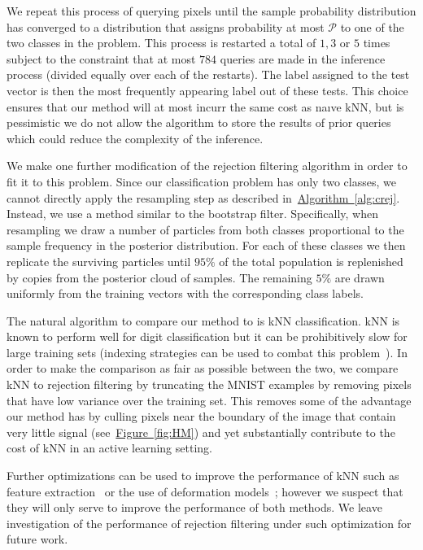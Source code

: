 \documentclass[twoside]{article}
\newcommand{\fig}[1]{\hyperref[fig:#1]{Figure~\ref*{fig:#1}}}
\newcommand{\alg}[1]{\hyperref[alg:#1]{Algorithm~\ref*{alg:#1}}}
\begin{document}
We repeat this process of querying pixels until the sample probability distribution has converged to a distribution that
assigns probability at most $\mathcal{P}$ to one of the two classes in the problem.  This process is restarted a total of
$1,3$ or $5$ times subject to the constraint that at most $784$ queries are made in the inference process (divided equally over each of the restarts).
The label assigned to the test vector is then the most frequently appearing label out of these tests.  This choice ensures that our method will at most
incurr the same cost as na\i ve kNN, but is pessimistic we do not allow the algorithm to store the results of prior queries which could reduce the 
complexity of the inference.

We make one further modification of the rejection filtering algorithm in order to fit it to this problem.  Since our classification problem has only two classes, we cannot directly apply the resampling step as described in~\alg{crej}.  Instead, we use a method similar to the bootstrap filter.  Specifically, when resampling we draw a number of particles from both
classes proportional to the sample frequency in the posterior distribution.  For each of these classes we then replicate the surviving particles until $95\%$ of the total population is replenished
by copies from the posterior cloud of samples.  The remaining $5\%$ are drawn uniformly from the training vectors with the corresponding class labels.

The natural algorithm to compare our method to is kNN classification.  kNN is known to perform well for digit classification but it can be prohibitively slow for
large training sets (indexing strategies can be used to combat this problem~\cite{yu2001indexing}).  In order to make the comparison as fair as possible between the two, we compare kNN to rejection filtering by truncating the 
MNIST examples by removing pixels that have low variance over the training set.  This removes some of the advantage our method has by culling pixels near
the boundary of the image that contain very little signal  (see~\fig{HM}) and yet substantially contribute to the cost of kNN in an active learning setting.

Further optimizations can be used to improve the performance of kNN such as feature extraction~\cite{zhang2006svm,weinberger2008fast,min2009deep} or the use of 
deformation models~\cite{keysers2007deformation};
however we suspect that they will only serve to improve the performance of both methods. We leave investigation of the performance of rejection filtering under such optimization
for future work.
\end{document}
